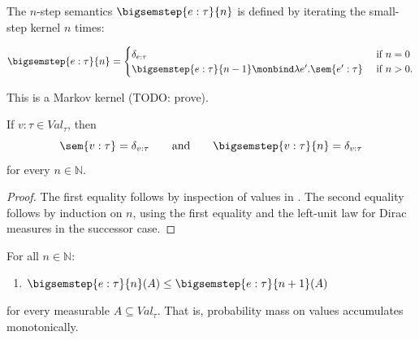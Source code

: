 \begin{definition}
  The $n$-step semantics $\bigsemstep{e : \tau}{n}$ is defined by iterating the small-step kernel $n$ times:

  \[
    \bigsemstep{e : \tau}{n} =   
    \begin{cases}
      \delta_{e : \tau} &\text{ if } n = 0 \\
      \bigsemstep{e : \tau}{n-1} \monbind \lambda e'.\sem{e' : \tau} &\text{ if } n > 0.
    \end{cases}
  \]

\end{definition}

This is a Markov kernel (TODO: prove).

\begin{lemma}\label{lem:values-absorbing}
  If $v : \tau \in Val_\tau$, then
  \[
    \sem{v : \tau} = \delta_{v : \tau}
    \qquad\text{and}\qquad
    \bigsemstep{v : \tau}{n} = \delta_{v : \tau}
  \]
  for every $n \in \mathbb{N}$.
\end{lemma}

\begin{proof}
  The first equality follows by inspection of values in
  . The second equality follows by induction on
  $n$, using the first equality and the left-unit law for Dirac measures in the
  successor case.
\end{proof}

\begin{lemma}
  For all $n \in \mathbb{N}$:
  \begin{enumerate}
    \item $\bigsemstep{e : \tau}{n}(A) \leq \bigsemstep{e : \tau}{n+1}(A)$
  \end{enumerate}
  for every measurable $A \subseteq Val_\tau$. That is, probability mass on values accumulates monotonically.
\end{lemma}

